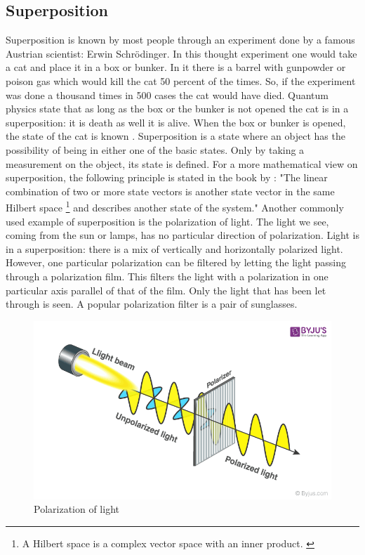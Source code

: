 \subsection{Superposition} \label{superposition}
Superposition is known by most people through an experiment done by a famous Austrian scientist: Erwin Schrödinger.
In this thought experiment one would take a cat and place it in a box or bunker. 
In it there is a barrel with gunpowder or poison gas which would kill the cat 50 percent of the times. So, if the experiment was done a thousand times in 500 cases the cat would have died.
Quantum physics state that as long as the box or the bunker is not opened the cat is in a superposition: it is death as well it is alive.
When the box or bunker is opened, the state of the cat is known \autocite{Villars_1986}.
Superposition is a state where an object has the possibility of being in either one of the basic states. Only by taking a measurement on the object, its state is defined.
For a more mathematical view on superposition, the following principle is stated in the book by \textcite{Hidary_2019}:
"The linear combination of two or more state vectors is another state vector in the same Hilbert space \footnote{A Hilbert space is a complex vector space with an inner product. \autocite{Griffiths2014}} and describes another state of the system."
Another commonly used example of superposition is the polarization of light. The light we see, coming from the sun or lamps, has no particular direction of polarization.
Light is in a superposition: there is a mix of vertically and horizontally polarized light. However, one particular polarization can be filtered by letting the light passing through a polarization film.
This filters the light with a polarization in one particular axis parallel of that of the film. Only the light that has been let through is seen.
A popular polarization filter is a pair of sunglasses.

\begin{figure} [h]
    \centering
    \includegraphics[width=\textwidth]{img/Polarization-of-Light-2.png}
        \caption{Polarization of light \autocite{imgpolar}}
        \label{fig:polarization}
\end{figure}


